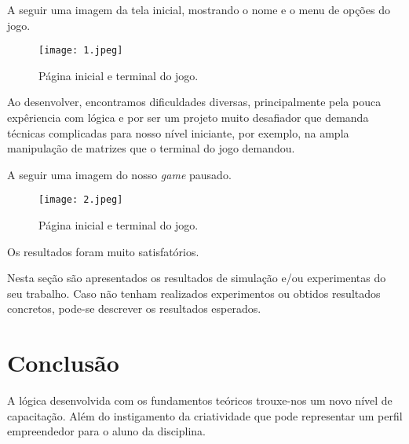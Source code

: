 \documentclass[journal]{IEEEtran}
\begin{document}
A seguir uma imagem da tela inicial, mostrando o nome e o menu de opções do jogo.

\begin{figure}[!htbp]
\centering
\texttt{[image: 1.jpeg]}
\caption{Página inicial e terminal do jogo.}
\label{fig:fig_exemple}
\end{figure}

Ao desenvolver, encontramos dificuldades diversas, principalmente pela pouca expêriencia com lógica e por ser um projeto muito desafiador que demanda técnicas complicadas para nosso nível iniciante, por exemplo, na ampla manipulação de matrizes que o terminal do jogo demandou.

A seguir uma imagem do nosso \textit{game} pausado.

\begin{figure}[!htbp]
\centering
\texttt{[image: 2.jpeg]}
\caption{Página inicial e terminal do jogo.}
\label{fig:fig_exemple}
\end{figure}

Os resultados foram muito satisfatórios.

Nesta seção são apresentados os resultados de simulação e/ou experimentas do seu trabalho. Caso não tenham realizados experimentos ou obtidos resultados concretos, pode-se descrever os resultados esperados.


\section{Conclusão}
A lógica desenvolvida com os fundamentos teóricos trouxe-nos um novo nível de capacitação. Além do instigamento da criatividade que pode representar um perfil empreendedor para o aluno da disciplina.


\appendices




\end{document}
